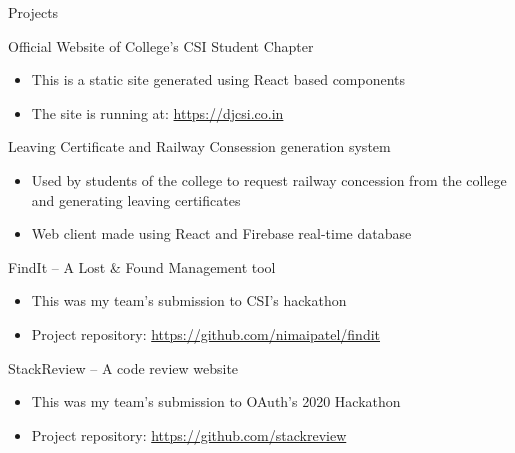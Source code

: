 \documentclass{article}
\newlength{\tabin}
\newlength{\secsep}
\newcommand{\lineunder}{\vspace*{-8pt} \\ \hspace*{-6pt} \hrulefill \\ \vspace*{-15pt}}
\newenvironment{tabbedsection}[1]{
	\begin{list}{}{
		\setlength{\itemsep}{0pt}
		\setlength{\labelsep}{0pt}
		\setlength{\labelwidth}{0pt}
		\setlength{\leftmargin}{\tabin}
		\setlength{\rightmargin}{\tabin}
		\setlength{\listparindent}{0pt}
		\setlength{\parsep}{0pt}
		\setlength{\parskip}{0pt}
		\setlength{\partopsep}{0pt}
		\setlength{\topsep}{#1}
	}
	\item[]
}{\end{list}}
\newenvironment{resume_section}[1]{
	\filbreak
	\vspace{2\secsep}
	\textsc{\large#1}
	\lineunder
	\begin{tabbedsection}{\secsep}
}{\end{tabbedsection}}
\newenvironment{resume_subsection}[2][]{
	\textbf{#2} \hfill {\footnotesize #1} \hspace{2em}
	\begin{tabbedsection}{0.5\secsep}
}{\end{tabbedsection}}
\newenvironment{subitems}{
	\renewcommand{\labelitemi}{-}
	\begin{itemize}
		\setlength{\labelsep}{1em}
}{\end{itemize}}
\begin{document}
\begin{resume_section}{Projects}
	\begin{resume_subsection}{Official Website of College's CSI Student Chapter}
		\begin{subitems}
			\item This is a static site generated using React based components
			\item The site is running at: \href{https://djcsi.co.in}{https://djcsi.co.in}
		\end{subitems}
	\end{resume_subsection}

	\begin{resume_subsection}{Leaving Certificate and Railway Consession generation system}
		\begin{subitems}
			\item Used by students of the college to request
				railway concession from the college and
				generating leaving certificates
			\item Web client made using React and Firebase real-time database
		\end{subitems}
	\end{resume_subsection}

	\begin{resume_subsection}{FindIt -- A Lost {\&} Found Management tool}
		\begin{subitems}
			\item This was my team's submission to CSI's hackathon
			\item Project repository: \href{https://github.com/nimaipatel/findit}{https://github.com/nimaipatel/findit}
		\end{subitems}
	\end{resume_subsection}

	\begin{resume_subsection}{StackReview -- A code review website}
		\begin{subitems}
			\item This was my team's submission to OAuth's 2020 Hackathon
			\item Project repository: \href{https://github.com/stackreview}{https://github.com/stackreview}
		\end{subitems}
	\end{resume_subsection}

\end{resume_section}

\vspace{1cm}
\end{document}
